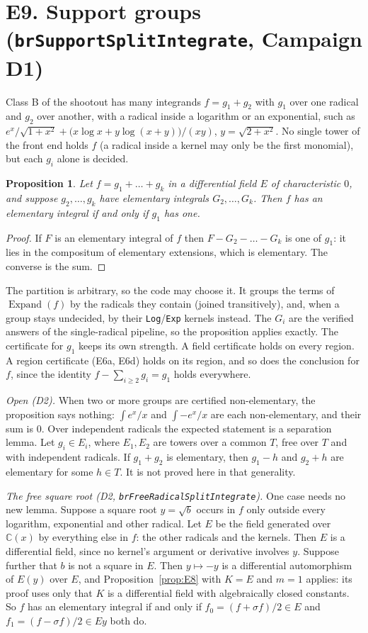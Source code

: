 \documentclass[11pt]{article}
\newtheorem{proposition}[theorem]{Proposition}
\theoremstyle{definition}
\theoremstyle{remark}
\newcommand{\C}{\mathbb{C}}
\newcommand{\code}[1]{\texttt{#1}}
\begin{document}
\section*{E9. Support groups (\code{brSupportSplitIntegrate}, Campaign D1)}
\label{sec:E9}

Class B of the shootout has many integrands $f=g_1+g_2$ with $g_1$ over one radical and
$g_2$ over another, with a radical inside a logarithm or an exponential, such as
$e^x/\sqrt{1+x^2}+\bigl(x\log x+y\log(x+y)\bigr)/(xy)$, $y=\sqrt{2+x^2}$. No single tower
of the front end holds $f$ (a radical inside a kernel may only be the first monomial),
but each $g_i$ alone is decided.

\begin{proposition}\label{prop:E9}
Let $f=g_1+\dots+g_k$ in a differential field $E$ of characteristic $0$, and suppose
$g_2,\dots,g_k$ have elementary integrals $G_2,\dots,G_k$. Then $f$ has an elementary
integral if and only if $g_1$ has one.
\end{proposition}
\begin{proof}
If $F$ is an elementary integral of $f$ then $F-G_2-\dots-G_k$ is one of $g_1$: it lies
in the compositum of elementary extensions, which is elementary. The converse is the sum.
\end{proof}
\noindent The partition is arbitrary, so the code may choose it. It groups the terms of
$\operatorname{Expand}(f)$ by the radicals they contain (joined transitively), and, when a
group stays undecided, by their \code{Log}/\code{Exp} kernels instead. The $G_i$ are the
verified answers of the single-radical pipeline, so the proposition applies exactly. The
certificate for $g_1$ keeps its own strength. A field certificate holds on every region.
A region certificate (E6a, E6d) holds on its region, and so does the conclusion for $f$,
since the identity $f-\sum_{i\ge2}g_i=g_1$ holds everywhere.

\emph{Open (D2).} When two or more groups are certified non-elementary, the proposition
says nothing: $\int e^x/x$ and $\int -e^x/x$ are each non-elementary, and their sum is
$0$. Over independent radicals the expected statement is a separation lemma. Let
$g_i\in E_i$, where $E_1,E_2$ are towers over a common $T$, free over $T$ and with
independent radicals. If $g_1+g_2$ is elementary, then $g_1-h$ and $g_2+h$ are elementary
for some $h\in T$. It is not proved here in that generality.

\emph{The free square root (D2, \code{brFreeRadicalSplitIntegrate}).} One case needs no
new lemma. Suppose a square root $y=\sqrt b$ occurs in $f$ only outside every logarithm,
exponential and other radical. Let $E$ be the field generated over $\C(x)$ by everything
else in $f$: the other radicals and the kernels. Then $E$ is a differential field, since
no kernel's argument or derivative involves $y$. Suppose further that $b$ is not a
square in $E$. Then $y\mapsto-y$ is a differential automorphism of $E(y)$ over $E$, and
Proposition~\ref{prop:E8} with $K=E$ and $m=1$ applies: its proof uses only that $K$ is
a differential field with algebraically closed constants. So $f$ has an elementary
integral if and only if $f_0=(f+\sigma f)/2\in E$ and $f_1=(f-\sigma f)/2\in Ey$ both do.
\end{document}
